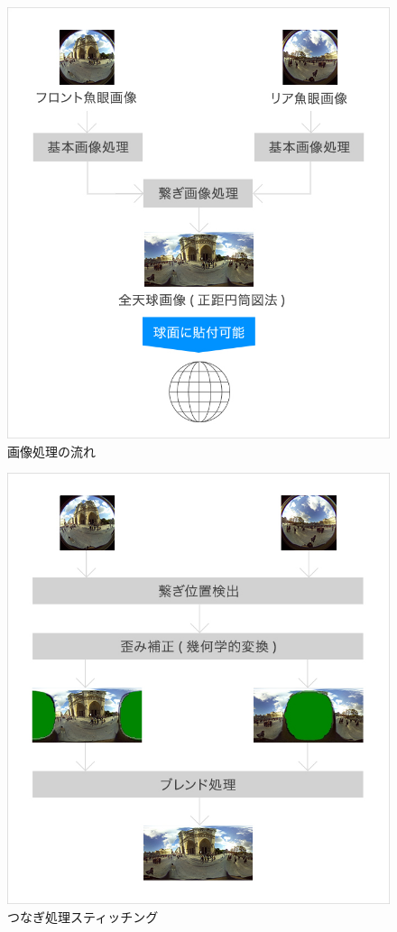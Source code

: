 \begin{figure}[tp]
  \centering
  \includegraphics[scale=0.6]{fig/thetaref1.jpg}
  \caption{画像処理の流れ\cite{4}}\label{theta1}
\end{figure}

\begin{figure}[tp]
  \centering
  \includegraphics[scale=0.6]{fig/thetaref2.jpg}
  \caption{つなぎ処理スティッチング\cite{4}}\label{theta2}
\end{figure}

